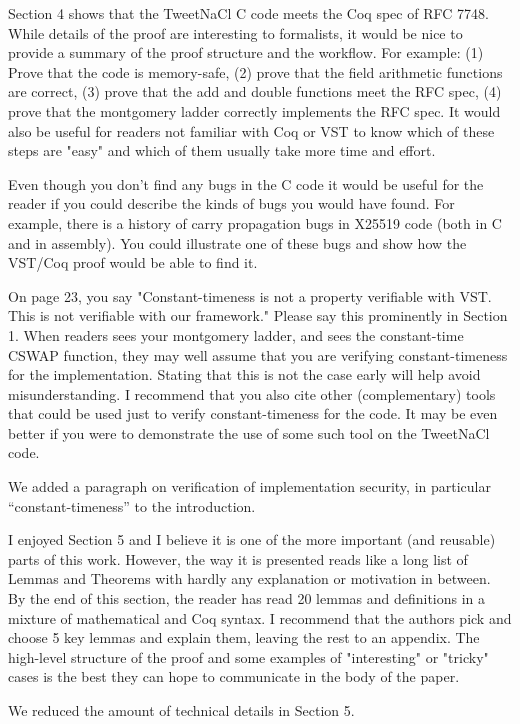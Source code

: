 Section 4 shows that the TweetNaCl C code meets the Coq spec of RFC 7748. While details of the proof are interesting to formalists, it would be nice to provide a summary of the proof structure and the workflow. For example: (1) Prove that the code is memory-safe, (2) prove that the field arithmetic functions are correct, (3) prove that the add and double functions meet the RFC spec, (4) prove that the montgomery ladder correctly implements the RFC spec. It would also be useful for readers not familiar with Coq or VST to know which of these steps are "easy" and which of them usually take more time and effort.

Even though you don't find any bugs in the C code it would be useful for the reader if you could describe the kinds of bugs you would have found. For example, there is a history of carry propagation bugs in X25519 code (both in C and in assembly). You could illustrate one of these bugs and show how the VST/Coq proof would be able to find it.

On page 23, you say "Constant-timeness is not a property verifiable with VST. This is not verifiable with our framework." Please say this prominently in Section 1. When readers sees your montgomery ladder, and sees the constant-time CSWAP function, they may well assume that you are verifying constant-timeness for the implementation. Stating that this is not the case early will help avoid misunderstanding. I recommend that you also cite other (complementary) tools that could be used just to verify constant-timeness for the code. It may be even better if you were to demonstrate the use of some such tool on the TweetNaCl code.
\begin{answer}
  We added a paragraph on verification of implementation security, in particular ``constant-timeness'' to the introduction.
\end{answer}

I enjoyed Section 5 and I believe it is one of the more important (and reusable) parts of this work. However, the way it is presented reads like a long list of Lemmas and Theorems with hardly any explanation or motivation in between. By the end of this section, the reader has read 20 lemmas and definitions in a mixture of mathematical and Coq syntax. I recommend that the authors pick and choose 5 key lemmas and explain them, leaving the rest to an appendix. The high-level structure of the proof and some examples of "interesting" or "tricky" cases is the best they can hope to communicate in the body of the paper.
\begin{answer}
  We reduced the amount of technical details in Section 5.
\end{answer}



